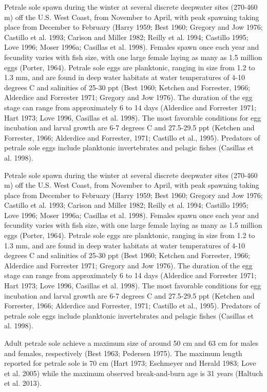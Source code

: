 \documentclass[12pt,]{article}
\begin{document}
Petrale sole spawn during the winter at several discrete deepwater sites
(270-460 m) off the U.S. West Coast, from November to April, with peak
spawning taking place from December to February (Harry 1959; Best 1960;
Gregory and Jow 1976; Castillo et al. 1993; Carison and Miller 1982;
Reilly et al. 1994; Castillo 1995; Love 1996; Moser 1996a; Casillas et
al. 1998). Females spawn once each year and fecundity varies with fish
size, with one large female laying as many as 1.5 million eggs (Porter,
1964). Petrale sole eggs are planktonic, ranging in size from 1.2 to 1.3
mm, and are found in deep water habitats at water temperatures of 4-10
degrees C and salinities of 25-30 ppt (Best 1960; Ketchen and Forrester,
1966; Alderdice and Forrester 1971; Gregory and Jow 1976). The duration
of the egg stage can range from approximately 6 to 14 days (Alderdice
and Forrester 1971; Hart 1973; Love 1996, Casillas et al. 1998). The
most favorable conditions for egg incubation and larval growth are 6-7
degrees C and 27.5-29.5 ppt (Ketchen and Forrester, 1966; Alderdice and
Forrester, 1971; Castillo et al., 1995). Predators of petrale sole eggs
include planktonic invertebrates and pelagic fishes (Casillas et al.
1998).

Petrale sole spawn during the winter at several discrete deepwater sites
(270-460 m) off the U.S. West Coast, from November to April, with peak
spawning taking place from December to February (Harry 1959; Best 1960;
Gregory and Jow 1976; Castillo et al. 1993; Carison and Miller 1982;
Reilly et al. 1994; Castillo 1995; Love 1996; Moser 1996a; Casillas et
al. 1998). Females spawn once each year and fecundity varies with fish
size, with one large female laying as many as 1.5 million eggs (Porter,
1964). Petrale sole eggs are planktonic, ranging in size from 1.2 to 1.3
mm, and are found in deep water habitats at water temperatures of 4-10
degrees C and salinities of 25-30 ppt (Best 1960; Ketchen and Forrester,
1966; Alderdice and Forrester 1971; Gregory and Jow 1976). The duration
of the egg stage can range from approximately 6 to 14 days (Alderdice
and Forrester 1971; Hart 1973; Love 1996, Casillas et al. 1998). The
most favorable conditions for egg incubation and larval growth are 6-7
degrees C and 27.5-29.5 ppt (Ketchen and Forrester, 1966; Alderdice and
Forrester, 1971; Castillo et al., 1995). Predators of petrale sole eggs
include planktonic invertebrates and pelagic fishes (Casillas et al.
1998).

Adult petrale sole achieve a maximum size of around 50 cm and 63 cm for
males and females, respectively (Best 1963; Pedersen 1975). The maximum
length reported for petrale sole is 70 cm (Hart 1973; Eschmeyer and
Herald 1983; Love et al. 2005) while the maximum observed break-and-burn
age is 31 years (Haltuch et al. 2013).
\end{document}
